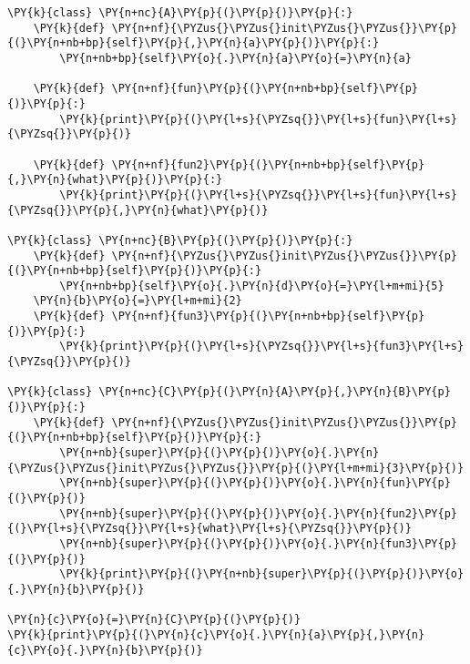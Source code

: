 \begin{Verbatim}[commandchars=\\\{\}]
\PY{k}{class} \PY{n+nc}{A}\PY{p}{(}\PY{p}{)}\PY{p}{:}
    \PY{k}{def} \PY{n+nf}{\PYZus{}\PYZus{}init\PYZus{}\PYZus{}}\PY{p}{(}\PY{n+nb+bp}{self}\PY{p}{,}\PY{n}{a}\PY{p}{)}\PY{p}{:}
        \PY{n+nb+bp}{self}\PY{o}{.}\PY{n}{a}\PY{o}{=}\PY{n}{a}

    \PY{k}{def} \PY{n+nf}{fun}\PY{p}{(}\PY{n+nb+bp}{self}\PY{p}{)}\PY{p}{:}
        \PY{k}{print}\PY{p}{(}\PY{l+s}{\PYZsq{}}\PY{l+s}{fun}\PY{l+s}{\PYZsq{}}\PY{p}{)}

    \PY{k}{def} \PY{n+nf}{fun2}\PY{p}{(}\PY{n+nb+bp}{self}\PY{p}{,}\PY{n}{what}\PY{p}{)}\PY{p}{:}
        \PY{k}{print}\PY{p}{(}\PY{l+s}{\PYZsq{}}\PY{l+s}{fun}\PY{l+s}{\PYZsq{}}\PY{p}{,}\PY{n}{what}\PY{p}{)}

\PY{k}{class} \PY{n+nc}{B}\PY{p}{(}\PY{p}{)}\PY{p}{:}
    \PY{k}{def} \PY{n+nf}{\PYZus{}\PYZus{}init\PYZus{}\PYZus{}}\PY{p}{(}\PY{n+nb+bp}{self}\PY{p}{)}\PY{p}{:}
        \PY{n+nb+bp}{self}\PY{o}{.}\PY{n}{d}\PY{o}{=}\PY{l+m+mi}{5}
    \PY{n}{b}\PY{o}{=}\PY{l+m+mi}{2}
    \PY{k}{def} \PY{n+nf}{fun3}\PY{p}{(}\PY{n+nb+bp}{self}\PY{p}{)}\PY{p}{:}
        \PY{k}{print}\PY{p}{(}\PY{l+s}{\PYZsq{}}\PY{l+s}{fun3}\PY{l+s}{\PYZsq{}}\PY{p}{)}

\PY{k}{class} \PY{n+nc}{C}\PY{p}{(}\PY{n}{A}\PY{p}{,}\PY{n}{B}\PY{p}{)}\PY{p}{:}
    \PY{k}{def} \PY{n+nf}{\PYZus{}\PYZus{}init\PYZus{}\PYZus{}}\PY{p}{(}\PY{n+nb+bp}{self}\PY{p}{)}\PY{p}{:}
        \PY{n+nb}{super}\PY{p}{(}\PY{p}{)}\PY{o}{.}\PY{n}{\PYZus{}\PYZus{}init\PYZus{}\PYZus{}}\PY{p}{(}\PY{l+m+mi}{3}\PY{p}{)}
        \PY{n+nb}{super}\PY{p}{(}\PY{p}{)}\PY{o}{.}\PY{n}{fun}\PY{p}{(}\PY{p}{)}
        \PY{n+nb}{super}\PY{p}{(}\PY{p}{)}\PY{o}{.}\PY{n}{fun2}\PY{p}{(}\PY{l+s}{\PYZsq{}}\PY{l+s}{what}\PY{l+s}{\PYZsq{}}\PY{p}{)}
        \PY{n+nb}{super}\PY{p}{(}\PY{p}{)}\PY{o}{.}\PY{n}{fun3}\PY{p}{(}\PY{p}{)}
        \PY{k}{print}\PY{p}{(}\PY{n+nb}{super}\PY{p}{(}\PY{p}{)}\PY{o}{.}\PY{n}{b}\PY{p}{)}

\PY{n}{c}\PY{o}{=}\PY{n}{C}\PY{p}{(}\PY{p}{)}
\PY{k}{print}\PY{p}{(}\PY{n}{c}\PY{o}{.}\PY{n}{a}\PY{p}{,}\PY{n}{c}\PY{o}{.}\PY{n}{b}\PY{p}{)}
\end{Verbatim}
